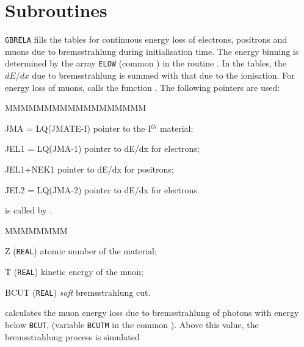   
\section{Subroutines}
{\tt GBRELA} fills the tables for continuous energy loss of electrons,
positrons and muons due to bremsstrahlung during initialisation time.
The energy binning is determined by
the array {\tt ELOW} (common ) in the
routine . In the tables, the $dE/dx$ due to bremsstrahlung
is summed with that due to the ionisation. For energy loss
of muons,  calls the function .
The following pointers are used:
\begin{DLtt}{MMMMMMMMMMMMMMMMMM}
\item[JMA = LQ(JMATE-I)] pointer to the I$^{th}$ material;
\item[JEL1 = LQ(JMA-1)]  pointer to dE/dx for electrons;
\item[JEL1+NEK1]           pointer to dE/dx for positrons;
\item[JEL2 = LQ(JMA-2)]  pointer to dE/dx for electrons.
\end{DLtt}
 is called by .
\begin{DLtt}{MMMMMMMM}
\item[Z] ({\tt REAL}) atomic number of the material;
\item[T] ({\tt REAL}) kinetic energy of the muon;
\item[BCUT] ({\tt REAL}) {\it soft} bremsstrahlung cut.
\end{DLtt}
 calculates the muon energy loss due to bremsstrahlung
of photons with energy below {\tt BCUT}, (variable {\tt BCUTM} in the
common ).
Above this value, the bremsstrahlung process is simulated
